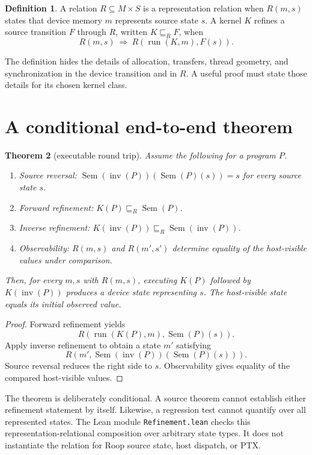 \documentclass[aop,preprint]{../aop-template/imsart}
\newtheorem{theorem}{Theorem}
\theoremstyle{definition}
\newtheorem{definition}[theorem]{Definition}
\newcommand{\Sem}[1]{\operatorname{Sem}(#1)}
\begin{document}
\begin{definition}
A relation $R\subseteq M\times S$ is a representation relation when $R(m,s)$ states that device memory $m$ represents source state $s$. A kernel $K$ refines a source transition $F$ through $R$, written $K\sqsubseteq_R F$, when
\[
 R(m,s)\ \Longrightarrow\ R(\operatorname{run}(K,m),F(s)).
\]
\end{definition}

The definition hides the details of allocation, transfers, thread geometry, and synchronization in the device transition and in $R$. A useful proof must state those details for its chosen kernel class.

\section{A conditional end-to-end theorem}

\begin{theorem}[executable round trip]
Assume the following for a program $P$.
\begin{enumerate}
\item Source reversal: $\Sem{\operatorname{inv}(P)}(\Sem{P}(s))=s$ for every source state $s$.
\item Forward refinement: $K(P)\sqsubseteq_R\Sem{P}$.
\item Inverse refinement: $K(\operatorname{inv}(P))\sqsubseteq_R\Sem{\operatorname{inv}(P)}$.
\item Observability: $R(m,s)$ and $R(m',s')$ determine equality of the host-visible values under comparison.
\end{enumerate}
Then, for every $m,s$ with $R(m,s)$, executing $K(P)$ followed by $K(\operatorname{inv}(P))$ produces a device state representing $s$. The host-visible state equals its initial observed value.
\end{theorem}

\begin{proof}
Forward refinement yields
\[
 R(\operatorname{run}(K(P),m),\Sem{P}(s)).
\]
Apply inverse refinement to obtain a state $m'$ satisfying
\[
 R(m',\Sem{\operatorname{inv}(P)}(\Sem{P}(s))).
\]
Source reversal reduces the right side to $s$. Observability gives equality of the compared host-visible values.
\end{proof}

The theorem is deliberately conditional. A source theorem cannot establish either refinement statement by itself. Likewise, a regression test cannot quantify over all represented states. The Lean module \texttt{Refinement.lean} checks this representation-relational composition over arbitrary state types. It does not instantiate the relation for Roop source state, host dispatch, or PTX.
\end{document}
